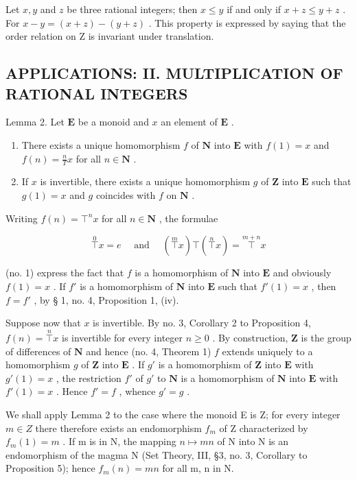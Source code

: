 Let \(x, y\) and \(z\) be three rational integers; then \(x \leqslant y\) if and only if \(x + z \leqslant y + z\) . For \(x - y = (x + z) - (y + z)\) . This property is expressed by saying that the order relation on Z is invariant under translation.

\subsection{APPLICATIONS: II. MULTIPLICATION OF RATIONAL INTEGERS}

Lemma 2. Let \(\mathbf{E}\) be a monoid and \(x\) an element of \(\mathbf{E}\) .

\begin{enumerate}
\def\labelenumi{(\roman{enumi})}
\item
  There exists a unique homomorphism \(f\) of \(\mathbf{N}\) into \(\mathbf{E}\) with \(f(1) = x\) and \(f(n) = \frac{n}{T} x\) for all \(n \in \mathbf{N}\) .
\item
  If \(x\) is invertible, there exists a unique homomorphism \(g\) of \(\mathbf{Z}\) into \(\mathbf{E}\) such that \(g(1) = x\) and \(g\) coincides with \(f\) on \(\mathbf{N}\) .
\end{enumerate}

Writing \(f(n) = \top^n x\) for all \(n \in \mathbf{N}\) , the formulae

\[
\overset {0} {\top} x = e \quad \text { and } \quad \left(\overset {m} {\top} x\right) \top \left(\overset {n} {\top} x\right) = \overset {m + n} {\top} x
\]

(no. 1) express the fact that \(f\) is a homomorphism of \(\mathbf{N}\) into \(\mathbf{E}\) and obviously \(f(1) = x\) . If \(f'\) is a homomorphism of \(\mathbf{N}\) into \(\mathbf{E}\) such that \(f'(1) = x\) , then \(f = f'\) , by § 1, no. 4, Proposition 1, (iv).

Suppose now that \(x\) is invertible. By no. 3, Corollary 2 to Proposition 4, \(f(n) = \overset{n}{\top} x\) is invertible for every integer \(n \geqslant 0\) . By construction, \(\mathbf{Z}\) is the group of differences of \(\mathbf{N}\) and hence (no. 4, Theorem 1) \(f\) extends uniquely to a homomorphism \(g\) of \(\mathbf{Z}\) into \(\mathbf{E}\) . If \(g'\) is a homomorphism of \(\mathbf{Z}\) into \(\mathbf{E}\) with \(g'(1) = x\) , the restriction \(f'\) of \(g'\) to \(\mathbf{N}\) is a homomorphism of \(\mathbf{N}\) into \(\mathbf{E}\) with \(f'(1) = x\) . Hence \(f' = f\) , whence \(g' = g\) .

We shall apply Lemma 2 to the case where the monoid E is Z; for every integer \(m \in Z\) there therefore exists an endomorphism \(f_{m}\) of Z characterized by \(f_{m}(1) = m\) . If m is in N, the mapping \(n \mapsto mn\) of N into N is an endomorphism of the magma N (Set Theory, III, §3, no. 3, Corollary to Proposition 5); hence \(f_{m}(n) = mn\) for all m, n in N.

